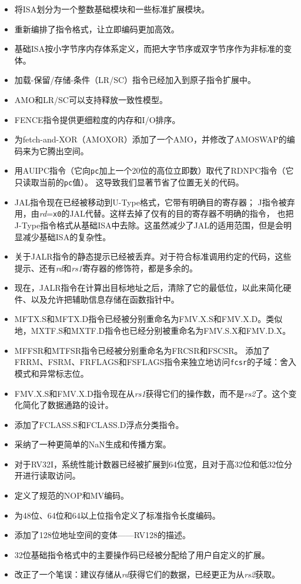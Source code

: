 \vspace{-0.1in}
\begin{itemize}
\parskip 0pt
\itemsep 1pt
\item 将ISA划分为一个整数基础模块和一些标准扩展模块。
\item 重新编排了指令格式，让立即编码更加高效。
\item 基础ISA按小字节序内存体系定义，而把大字节序或双字节序作为非标准的变体。
\item 加载-保留/存储-条件（LR/SC）指令已经加入到原子指令扩展中。
\item AMO和LR/SC可以支持释放一致性模型。
\item FENCE指令提供更细粒度的内存和I/O排序。
\item 为fetch-and-XOR（AMOXOR）添加了一个AMO，并修改了AMOSWAP的编码来为它腾出空间。
\item 用AUIPC指令（它向{\tt pc}加上一个20位的高位立即数）取代了RDNPC指令（它只读取当前的{\tt pc}值）。
这导致我们显著节省了位置无关的代码。
\item JAL指令现在已经被移动到U-Type格式，它带有明确目的寄存器；
J指令被弃用，由{\em rd}={\tt x0}的JAL代替。这样去掉了仅有的目的寄存器不明确的指令，
也把J-Type指令格式从基础ISA中去除。这虽然减少了JAL的适用范围，但是会明显减少基础ISA的复杂性。
\item 关于JALR指令的静态提示已经被丢弃。对于符合标准调用约定的代码，这些提示、还有{\em rd}和{\em rs1}寄存器的修饰符，都是多余的。
\item 现在，JALR指令在计算出目标地址之后，清除了它的最低位，以此来简化硬件、以及允许把辅助信息存储在函数指针中。
\item MFTX.S和MFTX.D指令已经被分别重命名为FMV.X.S和FMV.X.D。类似地，MXTF.S和MXTF.D指令也已经分别被重命名为FMV.S.X和FMV.D.X。
\item MFFSR和MTFSR指令已经被分别重命名为FRCSR和FSCSR。
添加了FRRM、FSRM、FRFLAGS和FSFLAGS指令来独立地访问{\tt fcsr}的子域：舍入模式和异常标志位。
\item FMV.X.S和FMV.X.D指令现在从{\em rs1}获得它们的操作数，而不是{\em rs2}了。这个变化简化了数据通路的设计。
\item 添加了FCLASS.S和FCLASS.D浮点分类指令。
\item 采纳了一种更简单的NaN生成和传播方案。
\item 对于RV32I，系统性能计数器已经被扩展到64位宽，且对于高32位和低32位分开进行读取访问。
\item 定义了规范的NOP和MV编码。
\item 为48位、64位和64以上位指令定义了标准指令长度编码。
\item 添加了128位地址空间的变体——RV128的描述。
\item 32位基础指令格式中的主要操作码已经被分配给了用户自定义的扩展。
\item 改正了一个笔误：建议存储从{\em rd}获得它们的数据，已经更正为从{\em rs2}获取。
\end{itemize}
\vspace{-0.1in}
